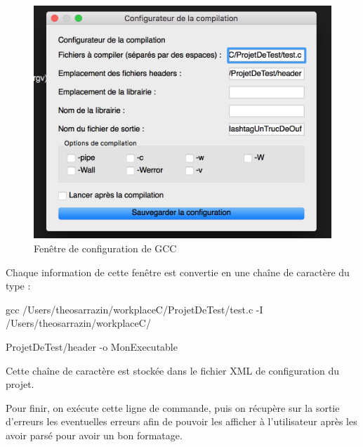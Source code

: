 \documentclass[a4paper,12pt]{article}
\begin{document}
			\begin{figure}[h!]
				\begin{center}
					\includegraphics[scale=0.7]{images/fenCompEx}
					\caption{Fenêtre de configuration de GCC}
				\end{center}
			\end{figure}

		Chaque information de cette fenêtre est convertie en une chaîne de caractère du type : 

		gcc /Users/theosarrazin/workplaceC/ProjetDeTest/test.c  -I /Users/theosarrazin/workplaceC/

		ProjetDeTest/header -o MonExecutable

		Cette chaîne de caractère est stockée dans le fichier XML de configuration du projet.

		Pour finir, on exécute cette ligne de commande, puis on récupère sur la sortie d'erreurs les eventuelles erreurs afin de pouvoir les afficher à l'utilisateur après les avoir parsé pour avoir un bon formatage.
\end{document}
